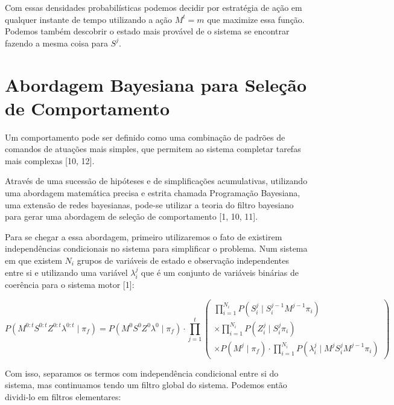 Com essas densidades probabilísticas podemos decidir por estratégia de ação em qualquer instante de tempo utilizando a ação $ M^t = m $ que maximize essa função. Podemos também descobrir o estado mais provável de o sistema se encontrar fazendo a mesma coisa para $ S^j $.


\section{Abordagem Bayesiana para Seleção de Comportamento}

Um comportamento pode ser definido como uma combinação de padrões de comandos de atuações mais simples, que permitem ao sistema completar tarefas mais complexas [10, 12].

Através de uma sucessão de hipóteses e de simplificações acumulativas, utilizando uma abordagem matemática precisa e estrita chamada Programação Bayesiana, uma extensão de redes bayesianas, pode-se utilizar a teoria do filtro bayesiano para gerar uma abordagem de seleção de comportamento [1, 10, 11].

Para se chegar a essa abordagem, primeiro utilizaremos o fato de existirem independências condicionais no sistema para simplificar o problema. Num sistema em que existem $ N_i $ grupos de variáveis de estado e observação independentes entre si e utilizando uma variável $ \lambda_i^j $ que é um conjunto de variáveis binárias de coerência para o sistema motor [1]:

\begin{equation}
    P \left( M^{0: t} S^{0: t} Z^{0: t} \lambda^{0: t}  \mid \pi_f \right) = P \left( M^0 S^0 Z^0 \lambda^0 \mid \pi_f \right) \cdot \prod\limits_{j =1}^{t} 
        \left(
            \begin{array}{l}
                \prod\limits_{i =1}^{N_i} P \left( S_i^j \mid S_i^{j -1} M^{j-1} \pi_i \right) \\
                \times \prod\limits_{i=1}^{N_i} P \left( Z_i^j \mid S_i^j \pi_i \right) \\
                \times P \left( M^j \mid \pi_f \right) \cdot \prod\limits_{i =1}^{N_i} P \left( \lambda_i^j \mid M^j S_i^j M^{j-1} \pi_i \right)
            \end{array}
        \right)
\end{equation}

Com isso, separamos os termos com independência condicional entre si do sistema, mas continuamos tendo um filtro global do sistema. Podemos então dividi-lo em filtros elementares:


